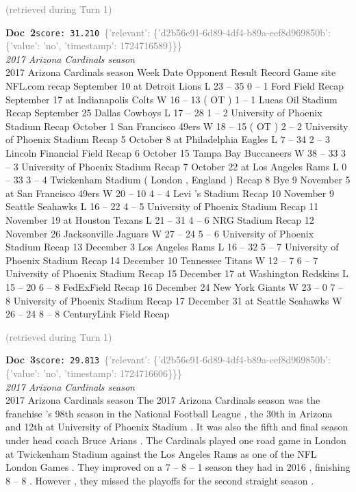 \documentclass[a4paper,11pt]{article}
\begin{document}
\hfill{\tiny\textcolor{gray}{(retrieved during Turn 1)}}
\begin{docenv}
{\footnotesize\textcolor{doccolor}{\textbf{Doc~2}}}\hfill{\tiny\texttt{score:~31.210}}\ {\tiny\textcolor{gray}{\{'relevant': \{'d2b56e91-6d89-4df4-b89a-eef8d969850b': \{'value': 'no', 'timestamp': 1724716589\}\}\}}}\\[3pt]
{\small\textit{2017 Arizona Cardinals season}}\\[2pt]
\vspace{2pt}
{\footnotesize 2017 Arizona Cardinals season
Week Date Opponent Result Record Game site NFL.com recap September 10 at Detroit Lions L 23 -- 35 0 -- 1 Ford Field Recap September 17 at Indianapolis Colts W 16 -- 13 ( OT ) 1 -- 1 Lucas Oil Stadium Recap September 25 Dallas Cowboys L 17 -- 28 1 -- 2 University of Phoenix Stadium Recap October 1 San Francisco 49ers W 18 -- 15 ( OT ) 2 -- 2 University of Phoenix Stadium Recap 5 October 8 at Philadelphia Eagles L 7 -- 34 2 -- 3 Lincoln Financial Field Recap 6 October 15 Tampa Bay Buccaneers W 38 -- 33 3 -- 3 University of Phoenix Stadium Recap 7 October 22 at Los Angeles Rams L 0 -- 33 3 -- 4 Twickenham Stadium ( London , England ) Recap 8 Bye 9 November 5 at San Francisco 49ers W 20 -- 10 4 -- 4 Levi 's Stadium Recap 10 November 9 Seattle Seahawks L 16 -- 22 4 -- 5 University of Phoenix Stadium Recap 11 November 19 at Houston Texans L 21 -- 31 4 -- 6 NRG Stadium Recap 12 November 26 Jacksonville Jaguars W 27 -- 24 5 -- 6 University of Phoenix Stadium Recap 13 December 3 Los Angeles Rams L 16 -- 32 5 -- 7 University of Phoenix Stadium Recap 14 December 10 Tennessee Titans W 12 -- 7 6 -- 7 University of Phoenix Stadium Recap 15 December 17 at Washington Redskins L 15 -- 20 6 -- 8 FedExField Recap 16 December 24 New York Giants W 23 -- 0 7 -- 8 University of Phoenix Stadium Recap 17 December 31 at Seattle Seahawks W 26 -- 24 8 -- 8 CenturyLink Field Recap}
\end{docenv}
\hfill{\tiny\textcolor{gray}{(retrieved during Turn 1)}}
\begin{docenv}
{\footnotesize\textcolor{doccolor}{\textbf{Doc~3}}}\hfill{\tiny\texttt{score:~29.813}}\ {\tiny\textcolor{gray}{\{'relevant': \{'d2b56e91-6d89-4df4-b89a-eef8d969850b': \{'value': 'no', 'timestamp': 1724716606\}\}\}}}\\[3pt]
{\small\textit{2017 Arizona Cardinals season}}\\[2pt]
\vspace{2pt}
{\footnotesize 2017 Arizona Cardinals season
The 2017 Arizona Cardinals season was the franchise 's 98th season in the National Football League , the 30th in Arizona and 12th at University of Phoenix Stadium . It was also the fifth and final season under head coach Bruce Arians . The Cardinals played one road game in London at Twickenham Stadium against the Los Angeles Rams as one of the NFL London Games . They improved on a 7 -- 8 -- 1 season they had in 2016 , finishing 8 -- 8 . However , they missed the playoffs for the second straight season .}
\end{docenv}
\end{document}
